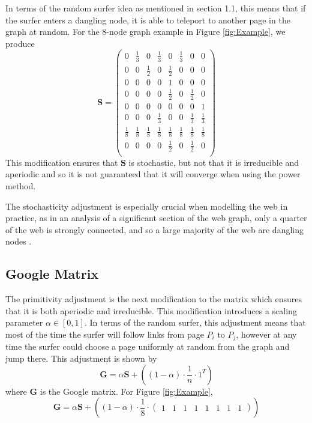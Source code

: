 \documentclass[11pt]{report}
\begin{document}
In terms of the random surfer idea as mentioned in section 1.1, this means that if the surfer enters a dangling node, it is able to teleport to another page in the graph at random. For the 8-node graph example in Figure \ref{fig:Example}, we produce  
\[ \renewcommand*{\arraystretch}{1.25} \textbf{S}=\left(
\begin{array}{cccccccc}
0 & \frac{1}{3} & 0 & \frac{1}{3} & 0 &\frac{1}{3} & 0& 0 \\
0 & 0 &\frac{1}{2}& 0 &\frac{1}{2}& 0 & 0 & 0\\
0 & 0 & 0 & 0 & 1 & 0 & 0 & 0\\
0 & 0 & 0 & 0 & \frac{1}{2} & 0 & \frac{1}{2} & 0\\
0 & 0 & 0 & 0 & 0 & 0 & 0 & 1\\
0 & 0 & 0 & \frac{1}{3} & 0 & 0 & \frac{1}{3} & \frac{1}{3} \\
\frac{1}{8} & \frac{1}{8} & \frac{1}{8} & \frac{1}{8} & \frac{1}{8} & \frac{1}{8} & \frac{1}{8} & \frac{1}{8}\\
0 & 0 & 0 & 0 & \frac{1}{2} & 0 & \frac{1}{2} & 0\\
\end{array}
\right)	\] This modification ensures that \textbf{S} is stochastic, but not that it is irreducible and aperiodic and so it is not guaranteed that it will converge when using the power method.

The stochasticity adjustment is especially crucial when modelling the web in practice, as in an analysis of a significant section of the web graph, only a quarter of the web is strongly connected, and so a large majority of the web are dangling nodes \cite{chakrabarti2002mining}.

\subsection{Google Matrix}\label{sec:google}
The primitivity adjustment is the next modification to the matrix which ensures that it is both aperiodic and irreducible. This modification introduces a scaling parameter $\alpha \in [0,1]$. In terms of the random surfer, this adjustment means that most of the time the surfer will follow links from page $P_i$ to $P_j$, however at any time the surfer could choose a page uniformly at random from the graph and jump there. This adjustment is shown by 
\begin{equation}\label{eq:G}
\textbf{G}=\alpha\textbf{S}+\left((1-\alpha)\cdot\frac{1}{n}\cdot1^T\right)
\end{equation} 
where \textbf{G} is the Google matrix. For Figure \ref{fig:Example},
\[\textbf{G}=\alpha\textbf{S}+\left((1-\alpha)\cdot \frac{1}{8} \cdot \left(  \begin{array}{cccccccc}
1&1&1&1&1&1&1&1\end{array}\right) \right)\]
\end{document}
